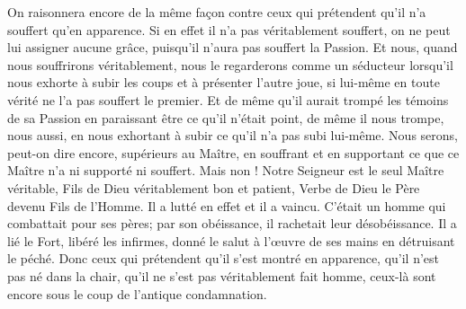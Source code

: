 On raisonnera encore de la même façon
	contre ceux qui prétendent qu'il n'a souffert qu'en apparence.
Si en effet il n'a pas véritablement souffert,
	on ne peut lui assigner aucune grâce,
	puisqu'il n'aura pas souffert la Passion.
Et nous, quand nous souffrirons véritablement,
	nous le regarderons comme un séducteur lorsqu'il nous exhorte
		à subir les coups et à présenter l'autre joue,
	si lui-même en toute vérité ne l'a pas souffert le premier.
Et de même qu'il aurait trompé les témoins de sa Passion
		en paraissant être ce qu'il n'était point,
	de même il nous trompe, nous aussi,
		en nous exhortant à subir ce qu'il n'a pas subi lui-même.
Nous serons, peut-on dire encore, supérieurs au Maître,
	en souffrant et en supportant ce que ce Maître n'a ni supporté ni souffert.
Mais non ! Notre Seigneur est le seul Maître véritable,
	Fils de Dieu véritablement bon et patient,
	Verbe de Dieu le Père devenu Fils de l'Homme.
Il a lutté en effet et il a vaincu.
C'était un homme qui combattait pour ses pères;
	par son obéissance, il rachetait leur désobéissance.
Il a lié le Fort, libéré les infirmes,
	donné le salut à l'œuvre de ses mains en détruisant le péché.
Donc ceux qui prétendent qu'il s'est montré en apparence,
	qu'il n'est pas né dans la chair, qu'il ne s'est pas véritablement fait homme,
	ceux-là sont encore sous le coup de l'antique condamnation.
